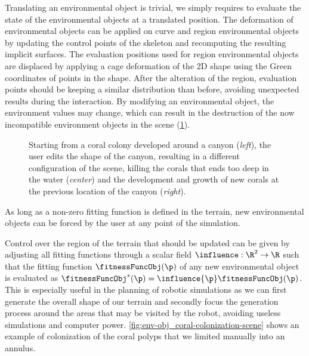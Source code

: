 Translating an environmental object is trivial, we simply requires to evaluate the state of the environmental objects at a translated position. The deformation of environmental objects can be applied on curve and region environmental objects by updating the control points of the skeleton and recomputing the resulting implicit surfaces. The evaluation positions used for region environmental objects are displaced by applying a cage deformation of the 2D shape using the Green coordinates of points in the shape. After the alteration of the region, evaluation points should be keeping a similar distribution than before, avoiding unexpected results during the interaction.
By modifying an environmental object, the environment values may change, which can result in the destruction of the now incompatible environment objects in the scene (\cref{fig:env-obj_user-interaction}).

\begin{figure}
    \caption{Starting from a coral colony developed around a canyon (\textit{left}), the user edits the shape of the canyon, resulting in a different configuration of the scene, killing the corals that ends too deep in the water (\textit{center}) and the development and growth of new corals at the previous location of the canyon (\textit{right}). }
    \label{fig:env-obj_user-interaction}
\end{figure}

As long as a non-zero fitting function is defined in the terrain, new environmental objects can be forced by the user at any point of the simulation. 

Control over the region of the terrain that should be updated can be given by adjusting all fitting functions through a scalar field $\influence: \R^2 \to \R $ such that the fitting function $\fitnessFuncObj(\p)$ of any new environmental object is evaluated as $\fitnessFuncObj^*(\p) = \influence{\p} \fitnessFuncObj(\p)$. This is especially useful in the planning of robotic simulations as we can first generate the overall shape of our terrain and secondly focus the generation process around the areas that may be visited by the robot, avoiding useless simulations and computer power. 
\cref{fig:env-obj_coral-colonization-scene} shows an example of colonization of the coral polyps that we limited manually into an annulus.

